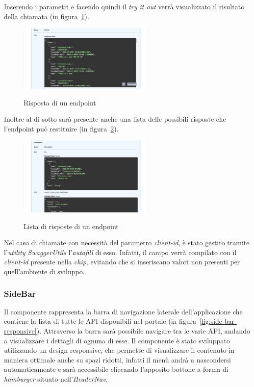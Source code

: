 Inserendo i parametri e facendo quindi il \textit{try it out} verrà visualizzato il risultato della chiamata (in figura~\ref{fig:risposta-endpoint}).

\begin{figure}[ht]
  \centering
  \includegraphics[width=0.6\textwidth, alt={Sezione per la visualizzazione della risposta di un endpoint}]{images/frontend/TryItOut3.jpg}
  \caption{Risposta di un endpoint}\label{fig:risposta-endpoint}
\end{figure}

Inoltre al di sotto sarà presente anche una lista delle possibili risposte che l'endpoint può restituire (in figura~\ref{fig:response-list}).

\begin{figure}[ht]
  \centering
  \includegraphics[width=0.6\textwidth, alt={Sezione per la visualizzazione delle possibili risposte di un endpoint}]{images/frontend/TryItOut4.jpg}
  \caption{Lista di risposte di un endpoint}\label{fig:response-list}
\end{figure}

\pagebreak

Nel caso di chiamate con necessità del parametro \textit{client-id}, è stato gestito tramite l'\textit{utility SwaggerUtils} l'\textit{autofill} di esso.
Infatti, il campo verrà compilato con il \textit{client-id} presente nella \textit{chip}, evitando che si inseriscano valori non presenti per 
quell'ambiente di sviluppo.


\subsubsection{SideBar}\label{subsubsec:side-bar}
Il componente rappresenta la barra di navigazione laterale dell'applicazione che contiene la lista di tutte le API disponibili nel portale (in figura~\ref{fig:side-bar-responsive}).
Attraverso la barra sarà possibile navigare tra le varie API, andando a visualizzare i dettagli di ognuna di esse. 
Il componente è stato sviluppato utilizzando un design responsive, che permette di visualizzare il contenuto in maniera ottimale anche su spazi ridotti, 
infatti il menù andrà a nascondersi automaticamente e sarà accessibile cliccando l'apposito bottone a forma di \textit{hamburger} situato nell'\textit{HeaderNav}.\\

